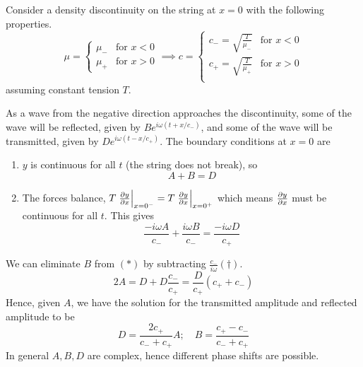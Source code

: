 \documentclass[a4paper]{article}
\begin{document}
Consider a density discontinuity on the string at \( x = 0 \) with the following properties.
\[
	\mu = \begin{cases}
		\mu_- & \text{for } x < 0 \\
		\mu_+ & \text{for } x > 0
	\end{cases} \implies c = \begin{cases}
		c_- = \sqrt{\frac{T}{\mu_-}} & \text{for } x < 0 \\
		c_+ = \sqrt{\frac{T}{\mu_+}} & \text{for } x > 0 \\
	\end{cases}
\]
assuming constant tension \( T \).

\begin{center}
\end{center}

As a wave from the negative direction approaches the discontinuity, some of the wave will be reflected, given by \( B e^{i \omega(t + x/c_-)} \), and some of the wave will be transmitted, given by \( D e^{i \omega(t - x/c_+)} \).
The boundary conditions at \( x = 0 \) are
\begin{enumerate}
	\item \( y \) is continuous for all \( t \) (the string does not break), so
	      \begin{equation}
		      A + B = D \tag{\(\ast\)}
	      \end{equation}
	\item The forces balance, \( T \eval{\pdv{y}{x}}_{x = 0^-} = T \eval{\pdv{y}{x}}_{x = 0^+} \) which means \( \pdv{y}{x} \) must be continuous for all \( t \).
	      This gives
	      \begin{equation}
		      \frac{-i\omega A}{c_-} + \frac{i \omega B}{c_-} = \frac{-i \omega D}{c_+} \tag{\(\dagger\)}
	      \end{equation}
\end{enumerate}
We can eliminate \( B \) from \( (\ast) \) by subtracting \( \frac{c_-}{i \omega}(\dagger) \).
\[
	2A = D + D \frac{c_-}{c_+} = \frac{D}{c_+}(c_+ + c_-)
\]
Hence, given \( A \), we have the solution for the transmitted amplitude and reflected amplitude to be
\[
	D = \frac{2 c_+}{c_- + c_+} A;\quad B = \frac{c_+ - c_-}{c_- + c_+}
\]
In general \( A, B, D \) are complex, hence different phase shifts are possible.
\end{document}
